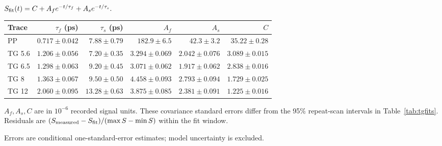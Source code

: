 \par\smallskip\begingroup\small
\setlength{\tabcolsep}{5pt}
\(S_{\rm fit}(t)=C+A_f e^{-t/\tau_f}+A_s e^{-t/\tau_s}.\)
\par\smallskip\begin{tabular}{lrrrrr}\toprule
Trace & $\tau_f$ (ps) & $\tau_s$ (ps) & $A_f$ & $A_s$ & $C$\\\midrule
PP & $0.717\pm0.042$ & $7.88\pm0.79$ & $182.9\pm6.5$ & $42.3\pm3.2$ & $35.22\pm0.28$\\
TG 5.6 & $1.206\pm0.056$ & $7.20\pm0.35$ & $3.294\pm0.069$ & $2.042\pm0.076$ & $3.089\pm0.015$\\
TG 6.5 & $1.298\pm0.063$ & $9.20\pm0.45$ & $3.071\pm0.062$ & $1.917\pm0.062$ & $2.838\pm0.016$\\
TG 8 & $1.363\pm0.067$ & $9.50\pm0.50$ & $4.458\pm0.093$ & $2.793\pm0.094$ & $1.729\pm0.025$\\
TG 12 & $2.060\pm0.095$ & $13.28\pm0.63$ & $3.875\pm0.085$ & $2.381\pm0.091$ & $1.225\pm0.016$\\
\bottomrule\end{tabular}
\par\smallskip\noindent $A_f,A_s,C$ are in $10^{-6}$ recorded signal units. These covariance standard errors differ from the 95\% repeat-scan intervals in Table~\ref{tab:tgfits}. Residuals are $(S_{\rm measured}-S_{\rm fit})/(\max S-\min S)$ within the fit window.
\par\smallskip\noindent Errors are conditional one-standard-error estimates; model uncertainty is excluded.
\par\endgroup
